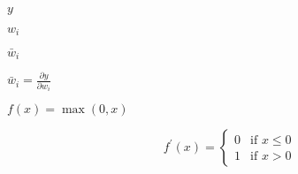 \documentclass{article}
\begin{document}
$y$
\pagebreak

$w_i$
\pagebreak

$\bar{w}_i$
\pagebreak

$\bar{w}_i = \frac{\partial y}{\partial w_i}$
\pagebreak

$f(x) = \max(0, x)$
\pagebreak

\[ f^\prime(x) = \begin{cases} 0 & \text{if } x \leq 0 \\ 1 & \text{if } x > 0 \end{cases} \]
\pagebreak
\end{document}
